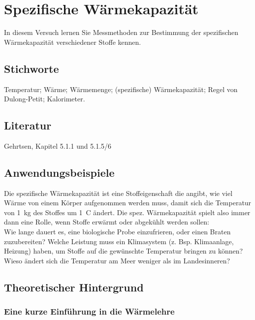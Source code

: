 \chapter{Spezifische Wärmekapazität}
\label{v:5}

In diesem Versuch lernen Sie Messmethoden zur Bestimmung der spezifischen Wärmekapazität verschiedener Stoffe kennen.

\section{Stichworte}
Temperatur; Wärme; Wärmemenge; (spezifische) Wärmekapazität; Regel von Dulong-Petit; Kalorimeter.
%
\section{Literatur}
Gehrtsen, Kapitel 5.1.1 und 5.1.5/6
%
\section{Anwendungsbeispiele}
%
Die spezifische Wärmekapazität ist eine Stoffeigenschaft die angibt, wie viel Wärme von einem Körper aufgenommen werden muss, damit sich die Temperatur von 1~kg des Stoffes um 1\degree~C ändert. Die spez. Wärmekapazität spielt also immer dann eine Rolle, wenn Stoffe erwärmt oder abgekühlt werden sollen:\\
Wie lange dauert es, eine biologische Probe einzufrieren, oder einen Braten zuzubereiten? Welche Leistung muss ein Klimasystem (z. Bsp. Klimaanlage, Heizung) haben, um Stoffe auf die gewünschte Temperatur bringen zu können? Wieso ändert sich die Temperatur am Meer weniger als im Landesinneren?
%
\section{Theoretischer Hintergrund}

\subsection{Eine kurze Einführung in die Wärmelehre}

